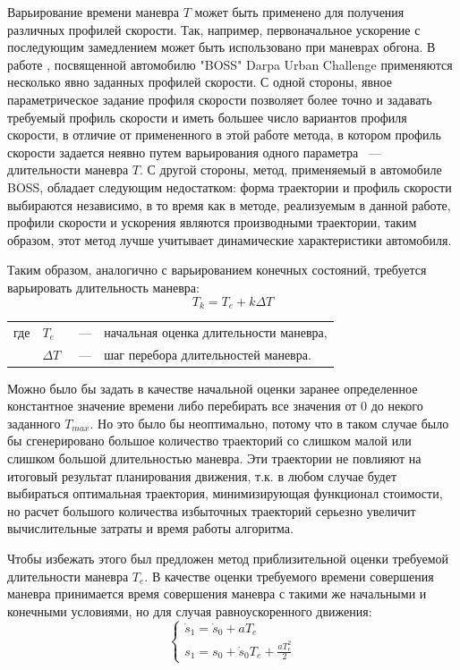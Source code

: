 Варьирование времени маневра $T$ может быть применено для получения различных профилей скорости. Так, например,
первоначальное ускорение с последующим замедлением может быть использовано при маневрах обгона.
В работе \cite{darpa_boss}, посвященной автомобилю "BOSS" Darpa Urban Challenge применяются несколько явно заданных
профилей скорости. С одной стороны, явное параметрическое задание профиля скорости позволяет более точно и задавать
требуемый профиль скорости и иметь большее число вариантов профиля скорости, в отличие от примененного в этой работе
метода, в котором профиль скорости задается неявно путем варьирования одного параметра ~--- длительности маневра $T$.
С другой стороны, метод, применяемый в автомобиле BOSS, обладает следующим недостатком: форма траектории и профиль
скорости выбираются независимо, в то время как в методе, реализуемым  в данной работе, профили скорости и ускорения
являются производными траектории, таким образом, этот метод лучше учитывает динамические характеристики автомобиля.

Таким образом, аналогично с варьированием конечных состояний, требуется варьировать длительность маневра:
\begin{equation}
      T_k = T_e + k\Delta T
\end{equation}
\noindent\begin{tabularx}{\linewidth}{lllX}
      где & $T_e$      &~---& начальная оценка длительности маневра, \\
          & $\Delta T$ &~---& шаг перебора длительностей маневра.
\end{tabularx}

Можно было бы задать в качестве начальной оценки заранее определенное константное значение времени либо перебирать
все значения от 0 до некого заданного $T_{max}$. Но это было бы неоптимально, потому что в таком случае было бы
сгенерировано большое количество траекторий со слишком малой или слишком большой длительностью маневра. Эти траектории
не повлияют на итоговый результат планирования движения, т.к. в любом случае будет выбираться оптимальная траектория,
минимизирующая функционал стоимости, но расчет большого количества избыточных траекторий серьезно увеличит вычислительные
затраты и время работы алгоритма.

Чтобы избежать этого был предложен метод приблизительной оценки требуемой длительности маневра $T_e$. В качестве оценки
требуемого времени совершения маневра принимается время совершения маневра с такими же начальными и конечными
условиями, но для случая равноускоренного движения:
\begin{equation}
      \begin{cases}
            \dot{s}_1 = \dot{s}_0 + aT_e \\
            s_1       = s_0       + \dot{s}_0T_e + \frac{aT_e^2}{2}
      \end{cases}
\end{equation}

